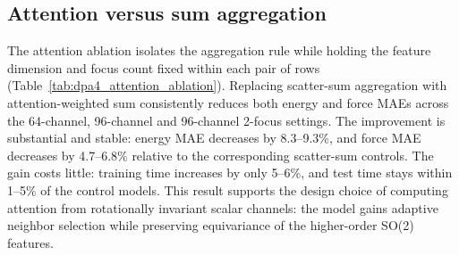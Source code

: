 \FloatBarrier
\subsection{Attention versus sum aggregation}
\label{sec:sm-attention-aggregation}

The attention ablation isolates the aggregation rule while holding the feature dimension and focus count fixed within each pair of rows (Table~\ref{tab:dpa4_attention_ablation}).
Replacing scatter-sum aggregation with attention-weighted sum consistently reduces both energy and force MAEs across the 64-channel, 96-channel and 96-channel 2-focus settings.
The improvement is substantial and stable: energy MAE decreases by 8.3--9.3\%, and force MAE decreases by 4.7--6.8\% relative to the corresponding scatter-sum controls.
The gain costs little: training time increases by only 5--6\%, and test time stays within 1--5\% of the control models.
This result supports the design choice of computing attention from rotationally invariant scalar channels: the model gains adaptive neighbor selection while preserving equivariance of the higher-order SO(2) features.

